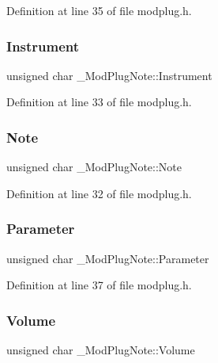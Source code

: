 Definition at line 35 of file modplug.\+h.

\mbox{\label{struct___mod_plug_note_a81617f5eafbddfd42b108f94ebb454c1}} 
\subsubsection{\texorpdfstring{Instrument}{Instrument}}
{\footnotesize\ttfamily unsigned char \+\_\+\+Mod\+Plug\+Note\+::\+Instrument}



Definition at line 33 of file modplug.\+h.

\mbox{\label{struct___mod_plug_note_a9d5d83d9ebcfbe8f5af9508f01f9a0c1}} 
\subsubsection{\texorpdfstring{Note}{Note}}
{\footnotesize\ttfamily unsigned char \+\_\+\+Mod\+Plug\+Note\+::\+Note}



Definition at line 32 of file modplug.\+h.

\mbox{\label{struct___mod_plug_note_ab00f709fda2b3d1fdd505bd3f9c3852c}} 
\subsubsection{\texorpdfstring{Parameter}{Parameter}}
{\footnotesize\ttfamily unsigned char \+\_\+\+Mod\+Plug\+Note\+::\+Parameter}



Definition at line 37 of file modplug.\+h.

\mbox{\label{struct___mod_plug_note_a2434d88ed6dadc634d8e594ffa915666}} 
\subsubsection{\texorpdfstring{Volume}{Volume}}
{\footnotesize\ttfamily unsigned char \+\_\+\+Mod\+Plug\+Note\+::\+Volume}



